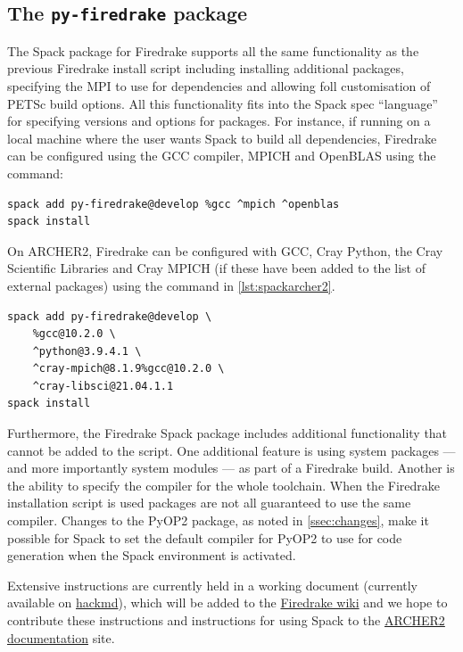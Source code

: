 \documentclass[a4paper,11pt]{article}
\begin{document}
\subsection{The \texttt{py-firedrake} package}
\label{ssec:py-firedrake}
The Spack package for Firedrake supports all the same functionality as the previous Firedrake install script including installing additional packages, specifying the MPI to use for dependencies and allowing foll customisation of PETSc build options.
All this functionality fits into the Spack spec ``language'' for specifying versions and options for packages.
For instance, if running on a local machine where the user wants Spack to build all dependencies, Firedrake can be configured using the GCC compiler, MPICH and OpenBLAS using the command:
\begin{lstlisting}
spack add py-firedrake@develop %gcc ^mpich ^openblas
spack install
\end{lstlisting}

On ARCHER2, Firedrake can be configured with GCC, Cray Python, the Cray Scientific Libraries and Cray MPICH (if these have been added to the list of external packages) using the command in \cref{lst:spackarcher2}.
\begin{lstlisting}[float,caption={Spack configuration for ARCHER2 using GCC, Cray Python, Cray MPICH and Cray scientific libraries},label={lst:spackarcher2}]
spack add py-firedrake@develop \
    %gcc@10.2.0 \
    ^python@3.9.4.1 \
    ^cray-mpich@8.1.9%gcc@10.2.0 \
    ^cray-libsci@21.04.1.1
spack install
\end{lstlisting}
Furthermore, the Firedrake Spack package includes additional functionality that cannot be added to the script.
One additional feature is using system packages --- and more importantly system modules --- as part of a Firedrake build.
Another is the ability to specify the compiler for the whole toolchain.
When the Firedrake installation script is used packages are not all guaranteed to use the same compiler.
Changes to the PyOP2 package, as noted in \cref{ssec:changes}, make it possible for Spack to set the default compiler for PyOP2 to use for code generation when the Spack environment is activated.

Extensive instructions are currently held in a working document (currently available on \href{https://hackmd.io/Sg3fYXuCTl61d_LAg4QnMw}{hackmd}), which will be added to the \href{https://github.com/firedrakeproject/firedrake/wiki}{Firedrake wiki}\cite{firedrakewiki} and we hope to contribute these instructions and instructions for using Spack to the \href{https://docs.archer2.ac.uk/}{ARCHER2 documentation}\cite{archer2docs} site.
\end{document}
